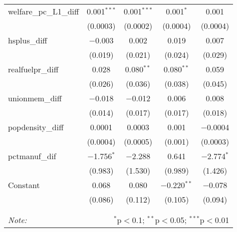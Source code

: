 \begin{table}[!htbp]
\begin{tabular}{@{\extracolsep{5pt}}lcccc}
  welfare\_pc\_L1\_diff & 0.001$^{***}$ & 0.001$^{***}$ & 0.001$^{*}$ & 0.001 \\ 
  & (0.0003) & (0.0002) & (0.0004) & (0.0004) \\ 
  hsplus\_diff & $-$0.003 & 0.002 & 0.019 & 0.007 \\ 
  & (0.019) & (0.021) & (0.024) & (0.029) \\ 
  realfuelpr\_diff & 0.028 & 0.080$^{**}$ & 0.080$^{**}$ & 0.059 \\ 
  & (0.026) & (0.036) & (0.038) & (0.045) \\ 
  unionmem\_diff & $-$0.018 & $-$0.012 & 0.006 & 0.008 \\ 
  & (0.014) & (0.017) & (0.017) & (0.018) \\ 
  popdensity\_diff & 0.0001 & 0.0003 & 0.001 & $-$0.0004 \\ 
  & (0.0004) & (0.0005) & (0.001) & (0.0003) \\ 
  pctmanuf\_dif & $-$1.756$^{*}$ & $-$2.288 & 0.641 & $-$2.774$^{*}$ \\ 
  & (0.983) & (1.530) & (0.989) & (1.426) \\ 
  Constant & 0.068 & 0.080 & $-$0.220$^{**}$ & $-$0.078 \\ 
  & (0.086) & (0.112) & (0.105) & (0.094) \\ 
 \hline \\[-1.8ex] 
\hline 
\hline \\[-1.8ex] 
\textit{Note:}  & \multicolumn{4}{r}{$^{*}$p$<$0.1; $^{**}$p$<$0.05; $^{***}$p$<$0.01} \\ 
\end{tabular} 
\end{table} 
